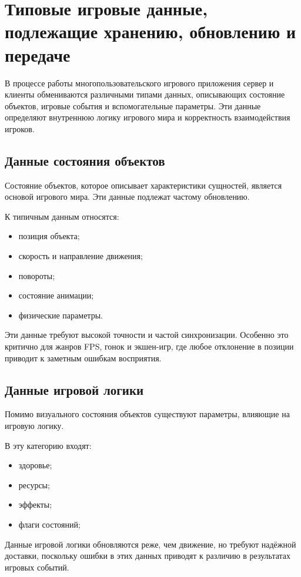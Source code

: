 \chapter{Типовые игровые данные, подлежащие хранению, обновлению и передаче}

В процессе работы многопользовательского игрового приложения сервер и клиенты обмениваются различными
типами данных\cite{gregory2018gamedev}, описывающих состояние объектов, игровые события и вспомогательные параметры. Эти данные
определяют внутреннюю логику игрового мира и корректность взаимодействия игроков.

\section{Данные состояния объектов}

Состояние объектов, которое описывает характеристики сущностей, является основой игрового мира. Эти данные подлежат частому обновлению.

К типичным данным относятся:
\begin{itemize}
    \item позиция объекта;
    \item скорость и направление движения;
    \item повороты;
    \item состояние анимации;
    \item физические параметры.
\end{itemize}

Эти данные требуют высокой точности и частой синхронизации. Особенно это критично для жанров FPS, гонок и экшен-игр,
где любое отклонение в позиции приводит к заметным ошибкам восприятия.

\section{Данные игровой логики}

Помимо визуального состояния объектов существуют параметры, влияющие на игровую логику.

В эту категорию входят:
\begin{itemize}
    \item здоровье;
    \item ресурсы;
    \item эффекты;
    \item флаги состояний;
\end{itemize}

Данные игровой логики обновляются реже, чем движение, но требуют надёжной доставки, поскольку ошибки в этих данных
приводят к различию в результатах игровых событий.

